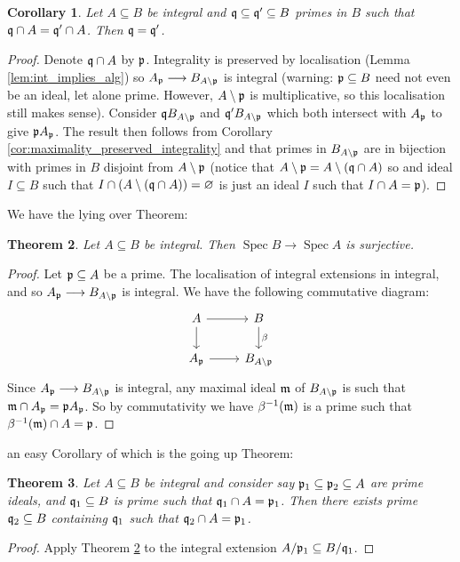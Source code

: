 \documentclass[12pt]{article}
\theoremstyle{plain}
\newtheorem{thm}{Theorem}[subsection] %
\newtheorem{cor}[thm]{Corollary}
\theoremstyle{definition}
\newcommand{\lto}{\longrightarrow}
\begin{document}
	\begin{cor}
		Let $A \subseteq B$ be integral and $\frak{q}\subseteq \frak{q}' \subseteq B$ primes in $B$ such that $\frak{q} \cap A = \frak{q}' \cap A$. Then $\frak{q} = \frak{q}'$.
	\end{cor}
	\begin{proof}
		Denote $\frak{q} \cap A$ by $\frak{p}$. Integrality is preserved by localisation (Lemma \ref{lem:int_implies_alg}) so $A_\frak{p} \lto B_{A\setminus\frak{p}}$ is integral (warning: $\frak{p} \subseteq B$ need not even be an ideal, let alone prime. However, $A\setminus \frak{p}$ is multiplicative, so this localisation still makes sense). Consider $\frak{q}B_{A\setminus\frak{p}}$ and $\frak{q}'B_{A\setminus\frak{p}}$ which both intersect with $A_\frak{p}$ to give $\frak{p}A_\frak{p}$. The result then follows from Corollary \ref{cor:maximality_preserved_integrality} and that primes in $B_{A\setminus\frak{p}}$ are in bijection with primes in $B$ disjoint from ${A\setminus\frak{p}}$ (notice that $A\setminus \frak{p} = A\setminus (\frak{q} \cap A)$ so and ideal $I \subseteq B$ such that $I \cap (A\setminus(\frak{q} \cap A)) = \varnothing$ is just an ideal $I$ such that $I \cap A = \frak{p}$).
	\end{proof}
	We have the lying over Theorem:
	\begin{thm}
		\label{thm:lying_over}
		Let $A \subseteq B$ be integral. Then $\operatorname{Spec}B \lto \operatorname{Spec}A$ is surjective.
	\end{thm}
	\begin{proof}
		Let $\frak{p} \subseteq A$ be a prime. The localisation of integral extensions in integral, and so $A_\frak{p} \lto B_{A\setminus\frak{p}}$ is integral. We have the following commutative diagram:
		\[
		\begin{tikzcd}
			A\arrow[r]\arrow[d] & B\arrow[d,"{\beta}"]\\
			A_\frak{p}\arrow[r] & B_{A\setminus\frak{p}}
		\end{tikzcd}
		\]
		Since $A_\frak{p} \lto B_{A\setminus\frak{p}}$ is integral, any maximal ideal $\frak{m}$ of $B_{A\setminus\frak{p}}$ is such that $\frak{m} \cap A_\frak{p} = \frak{p}A_\frak{p}$. So by commutativity we have $\beta^{-1}(\frak{m})$ is a prime such that $\beta^{-1}(\frak{m}) \cap A = \frak{p}$.
	\end{proof}
	an easy Corollary of which is the going up Theorem:
	\begin{thm}
		Let $A \subseteq B$ be integral and consider say $\frak{p}_1 \subseteq \frak{p}_2 \subseteq A$ are prime ideals, and $\frak{q}_1 \subseteq B$ is prime such that $\frak{q}_1 \cap A = \frak{p}_1$. Then there exists prime $\frak{q}_2 \subseteq B$ containing $\frak{q}_1$ such that $\frak{q}_2 \cap A = \frak{p}_1$.
	\end{thm}
	\begin{proof}
		Apply Theorem \ref{thm:lying_over} to the integral extension $A/\frak{p}_1 \subseteq B/\frak{q}_1$.
	\end{proof}
\end{document}

